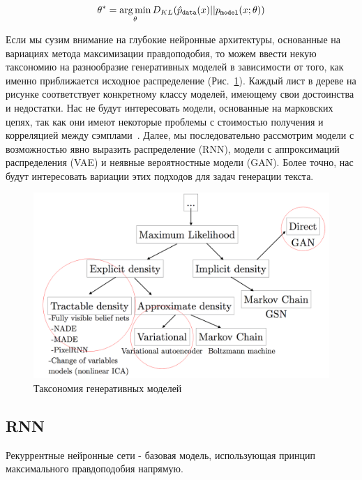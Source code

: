 \documentclass{spbau-diploma}
\begin{document}
\begin{equation}
\label{kl_maximum_likelihood}
\theta^* = \operatorname*{arg\,min}_{\theta} D_{KL}(\hat p_{\texttt{data}}(x) || p_{\texttt{model}}(x; \theta))
\end{equation}

Если мы сузим внимание на глубокие нейронные архитектуры, основанные на 
вариациях метода максимизации правдоподобия, то можем ввести некую таксономию 
на разнообразие генеративных моделей в зависимости от того, как именно 
приближается исходное распределение (Рис.~\ref{gen_taxonomy2}). Каждый лист в
дереве на рисунке соответствует конкретному классу моделей, имеющему свои 
достоинства и недостатки. Нас не будут интересовать модели, основанные на 
марковских цепях, так как они имеют некоторые проблемы с стоимостью получения и 
корреляцией между сэмплами~\cite{vetrovgan}. Далее, мы 
последовательно рассмотрим модели с возможностью явно выразить распределение 
(RNN), модели с аппроксимаций распределения (VAE) и неявные вероятностные 
модели (GAN). Более точно, нас будут интересовать вариации этих подходов для 
задач генерации текста.

\begin{figure}[H]
\centering
\includegraphics[width=\textwidth]{images/gen_taxonomy2.png}
\caption{Таксономия генеративных моделей~\cite{1701.00160}}
\label{gen_taxonomy2}
\end{figure}

\subsection{RNN}
Рекуррентные нейронные сети - базовая модель, использующая принцип максимального 
правдоподобия напрямую.
\end{document}

